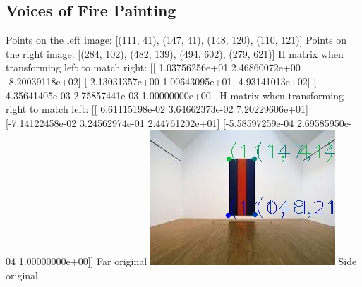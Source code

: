 \documentclass{article}
\begin{document}
\subsection {Voices of Fire Painting}
Points on the left image:
[(111, 41), (147, 41), (148, 120), (110, 121)]
Points on the right image:
[(284, 102), (482, 139), (494, 602), (279, 621)]
H matrix when transforming left to match right:
[[ 1.03756256e+01  2.46860072e+00 -8.20039118e+02]
 [ 2.13031357e+00  1.00643095e+01 -4.93141013e+02]
 [ 4.35641405e-03  2.75857441e-03  1.00000000e+00]]
H matrix when transforming right to match left:
[[ 6.61115198e-02  3.64662373e-02  7.20229606e+01]
 [-7.14122458e-02  3.24562974e-01  2.44761202e+01]
 [-5.58597259e-04  2.69585950e-04  1.00000000e+00]]
Far original 
\includegraphics[width=\linewidth]{./results/voices_of_fire/far.jpg}
Side original
\end{document}
